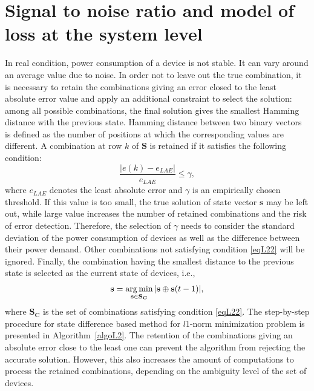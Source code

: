 \section{Signal to noise ratio and model of loss at the system level}\label{diff}
In real condition, power consumption of a device is not stable. It can vary around an average value due to noise. In order not to leave out the true combination, it is necessary to retain the combinations giving an error closed to the least absolute error value and apply an additional constraint to select the solution: among all possible combinations, the final solution gives the smallest Hamming distance with the previous state. Hamming distance between two binary vectors is defined as the number of positions at which the corresponding values are different. 
A combination at row $k$ of $\mathbf{S}$ is retained if it satisfies the following condition:
\begin{equation}\label{eqL22}
\frac{|e(k)-e_{LAE}|}{e_{LAE}}\leq \gamma,
\end{equation}
where $e_{LAE}$ denotes the least absolute error and $\gamma$ is an empirically chosen threshold.
If this value is too small, the true solution of state vector $\mathbf{s}$ may be left out, while large value increases the number of retained combinations and the risk of error detection. Therefore, the selection of $\gamma$ needs to consider the standard deviation of the power consumption of devices as well as the difference between their power demand. Other combinations not satisfying condition \eqref{eqL22} will be ignored.
Finally, the combination having the smallest distance to the previous state is selected as the current state of devices, i.e.,
\begin{equation}
\mathbf{s} = \operatorname*{arg\,min}_{\mathbf{s}\in \mathbf{S_C}}{|\mathbf{s}\oplus \mathbf{s}(t-1)|},
\end{equation}
where $\mathbf{S_C}$ is the set of combinations satisfying condition \eqref{eqL22}. The step-by-step procedure for state difference based method for $l1$-norm minimization problem is presented in Algorithm~\ref{algoL2}.
The retention of the combinations giving an absolute error close to the least one can prevent the algorithm from rejecting the accurate solution. However, this also increases the amount of computations to process the retained combinations, depending on the ambiguity level of the set of devices.

